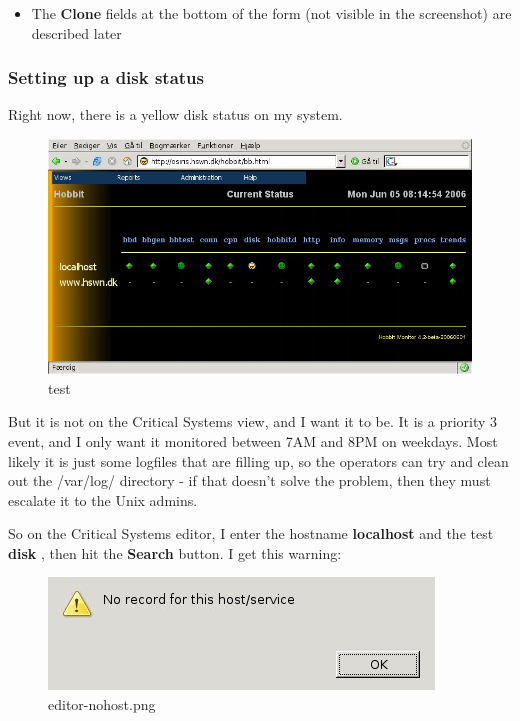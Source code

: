 \begin{itemize}
\item The \textbf{Clone}
 fields at the bottom of the form (not visible in the screenshot) are described later

\end{itemize}
\subsubsection{Setting up a disk status}


 Right now, there is a yellow disk status on my system. 
\begin{figure} \centering \caption{test}\label{fig1}
\includegraphics[scale=0.5]{./mainview.png} 
\end{figure}

 But it is not on the Critical Systems view, and I want it to be. It
 is a priority 3 event, and I only want it monitored between 7AM and
 8PM on weekdays. Most likely it is just some logfiles that are
 filling up, so the operators can try and clean out the /var/log/
 directory - if that doesn't solve the problem, then they must
 escalate it to the Unix admins.



 So on the Critical Systems editor, I enter the hostname \textbf{localhost}
 and the test \textbf{disk}
, then hit the \textbf{Search}
 button. I get this warning: 

\begin{figure} 
\centering 
\caption{editor-nohost.png}
\label{editor-nohost.png}
\includegraphics[scale=0.5]{./editor-nohost.png} 
\end{figure}


